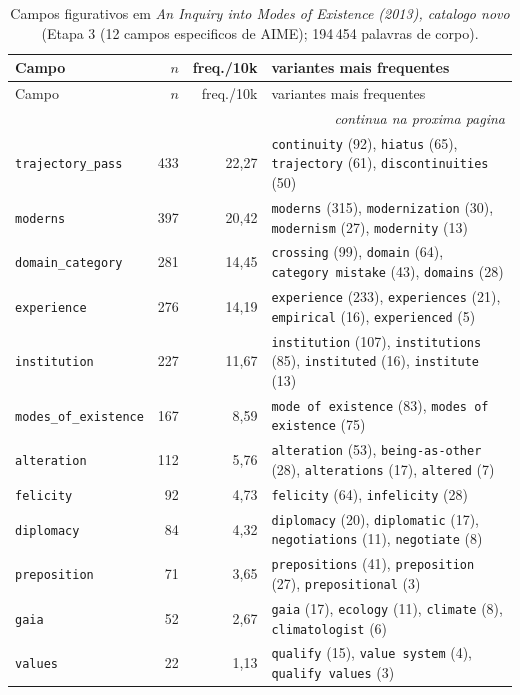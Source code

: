 {\footnotesize
\begin{longtable}{@{}l r r >{\raggedright\arraybackslash}p{6.4cm}@{}}
\caption{Campos figurativos em \emph{An Inquiry into Modes of Existence (2013), catalogo novo} (Etapa 3 (12 campos especificos de AIME); 194\,454 palavras de corpo).}\label{tab:campos-aimeN}\\
\toprule
Campo & $n$ & freq./10k & variantes mais frequentes \\
\midrule \endfirsthead
\toprule Campo & $n$ & freq./10k & variantes mais frequentes \\ \midrule \endhead
\midrule \multicolumn{4}{r}{\footnotesize \emph{continua na proxima pagina}}\\ \endfoot
\bottomrule \endlastfoot
\texttt{trajectory\_pass} & 433 & 22{,}27 & \texttt{continuity} (92), \texttt{hiatus} (65), \texttt{trajectory} (61), \texttt{discontinuities} (50) \\
\texttt{moderns} & 397 & 20{,}42 & \texttt{moderns} (315), \texttt{modernization} (30), \texttt{modernism} (27), \texttt{modernity} (13) \\
\texttt{domain\_category} & 281 & 14{,}45 & \texttt{crossing} (99), \texttt{domain} (64), \texttt{category mistake} (43), \texttt{domains} (28) \\
\texttt{experience} & 276 & 14{,}19 & \texttt{experience} (233), \texttt{experiences} (21), \texttt{empirical} (16), \texttt{experienced} (5) \\
\texttt{institution} & 227 & 11{,}67 & \texttt{institution} (107), \texttt{institutions} (85), \texttt{instituted} (16), \texttt{institute} (13) \\
\texttt{modes\_of\_existence} & 167 & 8{,}59 & \texttt{mode of existence} (83), \texttt{modes of existence} (75) \\
\texttt{alteration} & 112 & 5{,}76 & \texttt{alteration} (53), \texttt{being-as-other} (28), \texttt{alterations} (17), \texttt{altered} (7) \\
\texttt{felicity} & 92 & 4{,}73 & \texttt{felicity} (64), \texttt{infelicity} (28) \\
\texttt{diplomacy} & 84 & 4{,}32 & \texttt{diplomacy} (20), \texttt{diplomatic} (17), \texttt{negotiations} (11), \texttt{negotiate} (8) \\
\texttt{preposition} & 71 & 3{,}65 & \texttt{prepositions} (41), \texttt{preposition} (27), \texttt{prepositional} (3) \\
\texttt{gaia} & 52 & 2{,}67 & \texttt{gaia} (17), \texttt{ecology} (11), \texttt{climate} (8), \texttt{climatologist} (6) \\
\texttt{values} & 22 & 1{,}13 & \texttt{qualify} (15), \texttt{value system} (4), \texttt{qualify values} (3) \\
\end{longtable}}
